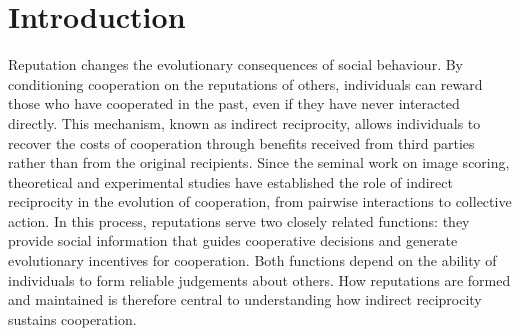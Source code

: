 \section*{Introduction}

Reputation changes the evolutionary consequences of social behaviour. By conditioning cooperation on the reputations of others, individuals can reward those who have cooperated in the past, even if they have never interacted directly. This mechanism, known as indirect reciprocity, allows individuals to recover the costs of cooperation through benefits received from third parties rather than from the original recipients\cite{alexander1987,nowak1998,nowak2005}. Since the seminal work on image scoring\cite{nowak1998}, theoretical and experimental studies have established the role of indirect reciprocity in the evolution of cooperation, from pairwise interactions\cite{wedekind2000,leimar2001,schmid2021nhb} to collective action\cite{milinski2002,panchanathan2004,yoeli2013}. In this process, reputations serve two closely related functions: they provide social information that guides cooperative decisions and generate evolutionary incentives for cooperation\cite{milinski2016,nowak2005}. Both functions depend on the ability of individuals to form reliable judgements about others. How reputations are formed and maintained is therefore central to understanding how indirect reciprocity sustains cooperation.

